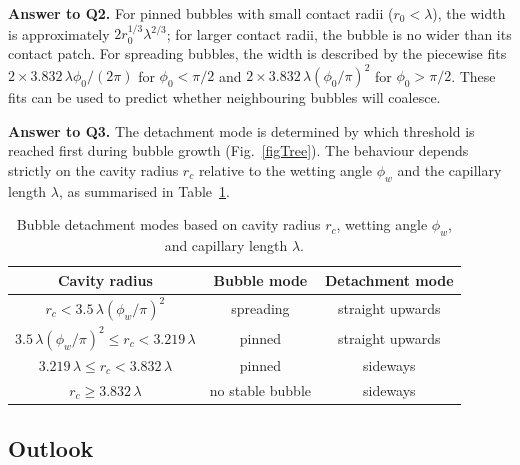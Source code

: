 \documentclass[9pt]{extarticle}
\begin{document}
\textbf{Answer to Q2.} For pinned bubbles with small contact radii ($r_0<\lambda$), the width is approximately $2r_0^{1/3}\lambda^{2/3}$; for larger contact radii, the bubble is no wider than its contact patch. For spreading bubbles, the width is described by the piecewise fits $2\times3.832\,\lambda\phi_0/(2\pi)$ for $\phi_0<\pi/2$ and $2\times3.832\,\lambda(\phi_0/\pi)^2$ for $\phi_0>\pi/2$. These fits can be used to predict whether neighbouring bubbles will coalesce.

\textbf{Answer to Q3.} The detachment mode is determined by which threshold is reached first during bubble growth (Fig.~\ref{figTree}). The behaviour depends strictly on the cavity radius $r_c$ relative to the wetting angle $\phi_w$ and the capillary length $\lambda$, as summarised in Table~\ref{tabDetachment}.

\begin{table}\small
\caption{Bubble detachment modes based on cavity radius $r_c$, wetting angle $\phi_w$, and capillary length $\lambda$.}\label{tabDetachment}
\begin{center}
\begin{tabular}{ccc}
\hline
Cavity radius & Bubble mode & Detachment mode \\
\hline
 $r_c < 3.5\,\lambda\left(\phi_w/\pi\right)^2$ & spreading & straight upwards \\
 $3.5\,\lambda\left(\phi_w/\pi\right)^2 \le r_c < 3.219\,\lambda$ & pinned & straight upwards \\
 $3.219\,\lambda \le r_c < 3.832\,\lambda$ & pinned & sideways \\
 $r_c \ge 3.832\,\lambda$ & no stable bubble & sideways \\
\hline
\end{tabular}
\end{center}
\end{table}

\subsection{Outlook}
\end{document}
